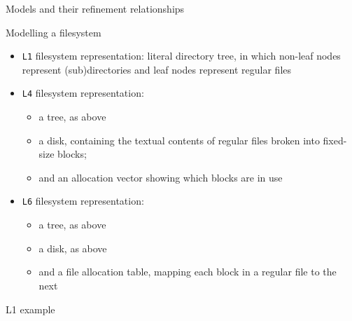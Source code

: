 \documentclass{beamer}
\begin{document}
\begin{frame}{Models and their refinement relationships}
\end{frame}

\begin{frame}{Modelling a filesystem}
  \begin{itemize}
  \item \texttt{L1} filesystem representation: literal
    directory tree, in which non-leaf nodes represent (sub)directories
      and leaf nodes represent regular files
  \item \texttt{L4} filesystem representation:
    \begin{itemize}
    \item a tree, as above
    \item a disk, containing the textual contents of regular files
      broken into fixed-size blocks;
    \item and an allocation vector showing which blocks are in use
    \end{itemize}
  \item \texttt{L6} filesystem representation:
    \begin{itemize}
    \item a tree, as above
    \item a disk, as above
    \item and a file allocation table, mapping each block in a regular
      file to the next
    \end{itemize}
  \end{itemize}
\end{frame}

\begin{frame}{L1 example}
\end{frame}
\end{document}
